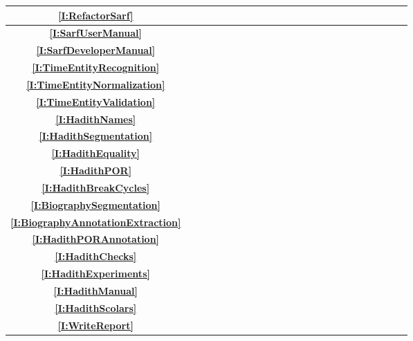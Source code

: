 \documentclass[a4,12pt]{report}
\newcommand{\X}{\cellcolor[gray]{0.5}}
\newcommand{\x}{\cellcolor[gray]{0.8}}
\begin{document}
\begin{table}[bt]
{\begin{tabular}{|c|c||c|c||c|c||c||c|c|c|c||c|c|c|c||c|}
\textbf{\ref{I:RefactorSarf}} 					& ~ & ~ & ~ & ~ & ~ & ~ & ~ & ~ & ~ & ~ & ~ & \X &\X & ~ & \\ \hline
\textbf{\ref{I:SarfUserManual}}					& ~ & ~ & ~ & ~ & ~ & ~ & ~ & ~ & ~ & ~ & ~ & ~ & \X & ~ & \\ \hline
\textbf{\ref{I:SarfDeveloperManual}}			& ~ & ~ & ~ & ~ & ~ & ~ & ~ & ~ & ~ & ~ & ~ & ~ & \X & ~ & \\ \toprule[0.1em] \bottomrule[0.1em]
\textbf{\ref{I:TimeEntityRecognition}}  		& \x &\X & ~ & ~ & ~ & ~ & ~ & ~ & ~ & ~ & ~ & ~ & ~ & ~ & \\ \hline
\textbf{\ref{I:TimeEntityNormalization}}		& ~ & \X &\X & ~ & ~ & ~ & ~ & ~ & ~ & ~ & ~ & ~ & ~ & ~ & \\ \hline 
\textbf{\ref{I:TimeEntityValidation}}			& ~ & ~ &\X & \X & ~ & ~ & ~ & ~ & ~ & ~ & ~ & ~ & ~ & ~ & \\ \toprule[0.1em] \bottomrule[0.1em]
\textbf{\ref{I:HadithNames}} 					& \X & ~ & ~ & ~ & ~ & ~ & ~ & ~ & ~ & ~ & ~ & ~ & ~ & ~ & \\ \hline 
\textbf{\ref{I:HadithSegmentation}} 			& \x & ~ & ~ & ~ &\X & ~ & ~ & ~ & ~ & ~ & ~ & ~ & ~ & ~ & \\ \hline
\textbf{\ref{I:HadithEquality}} 				& \x & ~ & ~ & ~ &\X & ~ & ~ & ~ & ~ & ~ & ~ & ~ & ~ & ~ & \\ \hline
\textbf{\ref{I:HadithPOR}} 						& \X & ~ & ~ & ~ & ~ & ~ & ~ & ~ & ~ & ~ & ~ & ~ & ~ & ~ & \\ \hline
\textbf{\ref{I:HadithBreakCycles}} 				& \x & ~ & ~ & ~ & ~ &\X & ~ & ~ & ~ & ~ & ~ & ~ & ~ & ~ & \\ \hline
\textbf{\ref{I:BiographySegmentation}} 			& ~ & ~ & ~ & ~ & ~ &\X & \X & ~ & ~ & ~ & ~ & ~ & ~ & ~ & \\ \hline
\textbf{\ref{I:BiographyAnnotationExtraction}} 	& ~ & ~ & ~ & ~ & ~ & ~ &\X &\X & \X & ~ & ~ & ~ & ~ & ~ & \\ \hline
\textbf{\ref{I:HadithPORAnnotation}} 			& ~ & ~ & ~ & ~ & ~ & ~ & ~ &\X & \X & ~ & ~ & ~ & ~ & ~ & \\ \hline
\textbf{\ref{I:HadithChecks}} 					& ~ & ~ & ~ & ~ & ~ & ~ & ~ & ~ &\X &\X & \X & ~ & ~ & ~ & \X \\ \hline
\textbf{\ref{I:HadithExperiments}} 				& ~ & ~ & ~ & ~ & ~ & ~ & ~ & ~ & ~ & ~ &\X & \X & ~ & ~ & \X \\ \hline
\textbf{\ref{I:HadithManual}} 					& ~ & ~ & ~ & ~ & ~ & ~ & ~ & ~ & ~ & ~ & ~ & ~ & \X & ~ & \\ \hline
\textbf{\ref{I:HadithScolars}} 					& ~ & ~ & ~ & ~ & ~ & ~ & ~ & ~ & ~ & ~ & ~ & ~ & ~  & ~ & \X \\ \toprule[0.1em] \bottomrule[0.1em]
\textbf{\ref{I:WriteReport}} 					& ~ & ~ & ~ & ~ & ~ & ~ & ~ & ~ & ~ & ~ & ~ & ~ & ~ & \X &  \\ \hline
\end{tabular}
}
\normalsize
\label{t:timetable}
\end{table}
\end{document}
